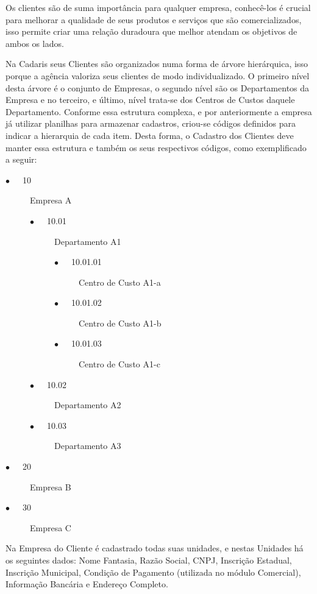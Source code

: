 \documentclass[
  12pt,				%
  openany,
  oneside,
  a4paper,			%
  english,			%
  brazil
]{article}
\numberwithin{figure}{section}
\numberwithin{table}{section}
\newcounter{subsubsubsection}[subsubsection]
\begin{document}

Os clientes são de suma importância para qualquer empresa, conhecê-los é crucial para melhorar a qualidade de seus produtos e serviços que são comercializados, isso permite criar uma relação duradoura que melhor atendam os objetivos de ambos os lados.%

Na Cadaris seus Clientes são organizados numa forma de árvore hierárquica, isso porque a agência valoriza seus clientes de modo individualizado. O primeiro nível desta árvore é o conjunto de Empresas, o segundo nível são os Departamentos da Empresa e no terceiro, e último, nível trata-se dos Centros de Custos daquele Departamento. Conforme essa estrutura complexa, e por anteriormente a empresa já utilizar planilhas para armazenar cadastros, criou-se códigos definidos para indicar a hierarquia de cada item. Desta forma, o Cadastro dos Clientes deve manter essa estrutura e também os seus respectivos códigos, como exemplificado a seguir:

\vspace{-1cm}
\begin{singlespace}
	\begin{description}
		\item[$\bullet$~~~10] Empresa A
		\begin{description}
			\item[$\bullet$~~~10.01] Departamento A1
			\begin{description}
				\item[$\bullet$~~~10.01.01] Centro de Custo A1-a
				\item[$\bullet$~~~10.01.02] Centro de Custo A1-b
				\item[$\bullet$~~~10.01.03] Centro de Custo A1-c
			\end{description}
			\item[$\bullet$~~~10.02] Departamento A2
			\item[$\bullet$~~~10.03] Departamento A3
		\end{description}
		\item[$\bullet$~~~20] Empresa B
		\item[$\bullet$~~~30] Empresa C
	\end{description}
\end{singlespace}

Na Empresa do Cliente é cadastrado todas suas unidades, e nestas Unidades há os seguintes dados: Nome Fantasia, Razão Social, CNPJ, Inscrição Estadual, Inscrição Municipal, Condição de Pagamento (utilizada no módulo Comercial), Informação Bancária e Endereço Completo.
\end{document}

